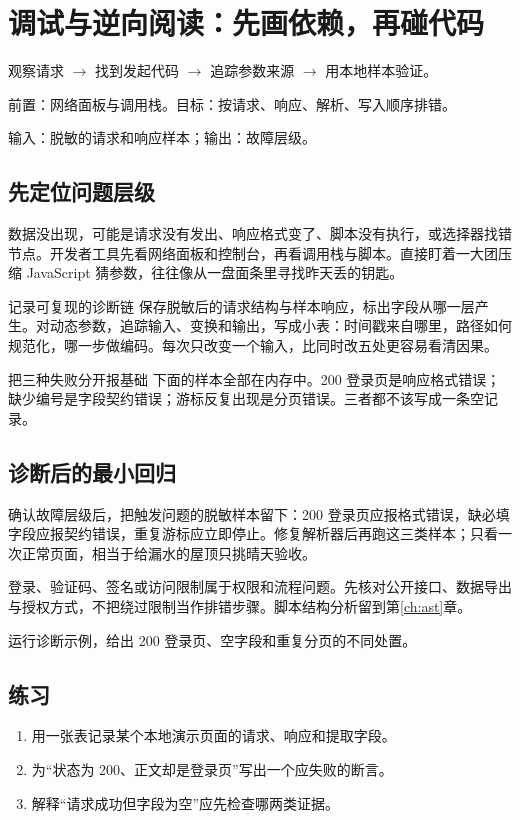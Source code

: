 \chapter{调试与逆向阅读：先画依赖，再碰代码}\label{ch:diagnostics}
\begin{tcolorbox}[title=章首知识地图,colframe=Ink]
观察请求 $\longrightarrow$ 找到发起代码 $\longrightarrow$ 追踪参数来源 $\longrightarrow$ 用本地样本验证。
\end{tcolorbox}

\begin{tcolorbox}[title=学习目标与前置知识,colframe=Ink!65,colback=Ink!2]
前置：网络面板与调用栈。目标：按请求、响应、解析、写入顺序排错。\par
输入：脱敏的请求和响应样本；输出：故障层级。
\end{tcolorbox}

\section{先定位问题层级}
数据没出现，可能是请求没有发出、响应格式变了、脚本没有执行，或选择器找错节点。开发者工具先看网络面板和控制台，再看调用栈与脚本。直接盯着一大团压缩 JavaScript 猜参数，往往像从一盘面条里寻找昨天丢的钥匙。

\begin{method}{记录可复现的诊断链}
保存脱敏后的请求结构与样本响应，标出字段从哪一层产生。对动态参数，追踪输入、变换和输出，写成小表：时间戳来自哪里，路径如何规范化，哪一步做编码。每次只改变一个输入，比同时改五处更容易看清因果。
\end{method}

\begin{example}{把三种失败分开报}{基础}
下面的样本全部在内存中。200 登录页是响应格式错误；缺少编号是字段契约错误；游标反复出现是分页错误。三者都不该写成一条空记录。
\end{example}

\section{诊断后的最小回归}
确认故障层级后，把触发问题的脱敏样本留下：200 登录页应报格式错误，缺必填字段应报契约错误，重复游标应立即停止。修复解析器后再跑这三类样本；只看一次正常页面，相当于给漏水的屋顶只挑晴天验收。

\begin{warning}
登录、验证码、签名或访问限制属于权限和流程问题。先核对公开接口、数据导出与授权方式，不把绕过限制当作排错步骤。脚本结构分析留到第\ref{ch:ast}章。
\end{warning}

\begin{tcolorbox}[title=本章验收,colframe=Teal,colback=Teal!3]
运行诊断示例，给出 200 登录页、空字段和重复分页的不同处置。
\end{tcolorbox}

\section{练习}
\begin{enumerate}[label=\arabic*.]
\item 用一张表记录某个本地演示页面的请求、响应和提取字段。
\item 为“状态为 200、正文却是登录页”写出一个应失败的断言。
\item 解释“请求成功但字段为空”应先检查哪两类证据。
\end{enumerate}
